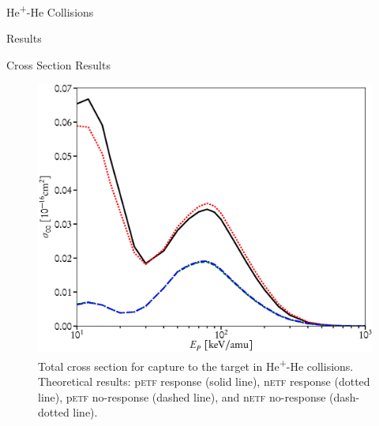 \documentclass[letterpaper, 11 pt]{report}
\begin{document}
\begin{chapter}{\texorpdfstring{He\textsuperscript{+}}{He+}-He Collisions \label{chap:hephe}}
\begin{section}{Results \label{sec:hephe-disc}}
\begin{subsection}{Cross Section Results \label{sec:hephe-res}}
         \begin{figure}[t]
            \begin{minipage}{.49\linewidth}
               \centering
               \includegraphics[width = \linewidth]{./images/hephe-cross/HepHe-300.eps}
               \caption[Total cross section for capture to the target in He\textsuperscript{+}-He
                        collisions.]
                       {Total cross section for capture to the target in He\textsuperscript{+}-He
                        collisions.
                        Theoretical results: p\textsc{etf} response (solid line), n\textsc{etf} response
                                             (dotted line), p\textsc{etf} no-response (dashed line), and
                                             n\textsc{etf} no-response (dash-dotted line).
                        \label{fig:cs300}}
            \end{minipage} \hspace{0.009\linewidth} %
            \begin{minipage}{.49\linewidth}
               \centering

\end{minipage}
\end{figure}
\end{subsection}
\end{section}
\end{chapter}
\end{document}

